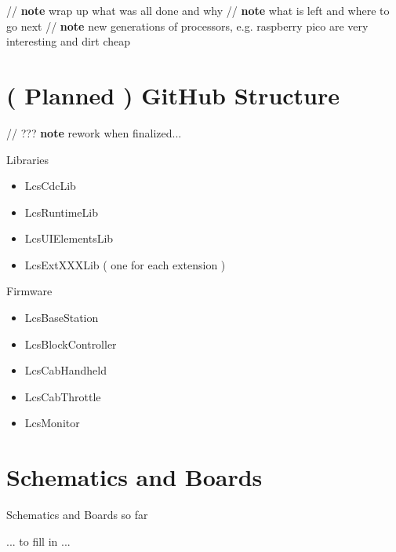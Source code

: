 
// \textbf{note} wrap up what was all done and why
// \textbf{note} what is left and where to go next
// \textbf{note} new generations of processors, e.g. raspberry pico are very interesting and dirt cheap


\section{( Planned ) GitHub Structure}

// ??? \textbf{note} rework when finalized... 

Libraries
\begin{itemize}
\item LcsCdcLib
\item LcsRuntimeLib
\item LcsUIElementsLib
\item LcsExtXXXLib ( one for each extension )
\end{itemize}

Firmware
\begin{itemize}
\item LcsBaseStation
\item LcsBlockController
\item LcsCabHandheld
\item LcsCabThrottle
\item LcsMonitor
\end{itemize}

\section{Schematics and Boards}

Schematics and Boards so far

... to fill in ...
